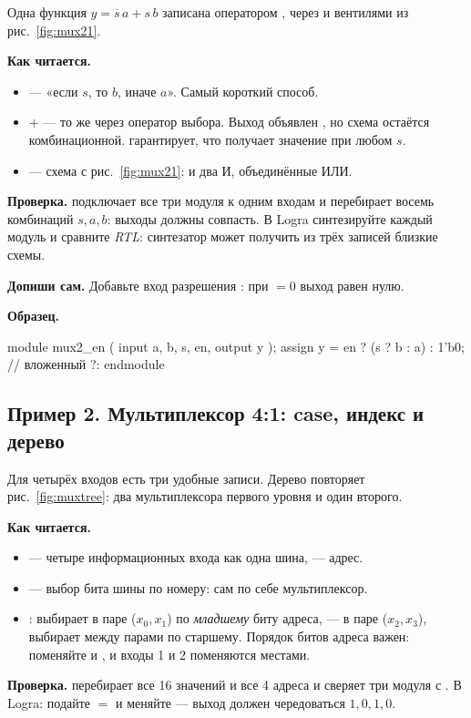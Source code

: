 Одна функция $y=\overline{s}\,a+s\,b$ записана оператором , через
 и вентилями из рис.~\ref{fig:mux21}.


\textbf{Как читается.}
\begin{itemize}
  \item {} --- «если $s$, то $b$, иначе $a$». Самый короткий способ.
  \item {} +  --- то же через оператор выбора. Выход объявлен , но схема остаётся комбинационной.  гарантирует, что  получает значение при любом $s$.
  \item {} --- схема с рис.~\ref{fig:mux21}:  и два И, объединённые ИЛИ.
\end{itemize}
\textbf{Проверка.}  подключает все три модуля к одним входам и
перебирает восемь комбинаций $s,a,b$: выходы должны совпасть. В Logra
синтезируйте каждый модуль и сравните \emph{RTL}: синтезатор может получить из
трёх записей близкие схемы.

\textbf{Допиши сам.} Добавьте вход разрешения : при  $=0$ выход
равен нулю.

\textbf{Образец.}
\begin{vcode}
module mux2_en (
    input  a, b, s, en,
    output y
);
    assign y = en ? (s ? b : a) : 1'b0;   // вложенный ?:
endmodule
\end{vcode}

\subsection{Пример 2. Мультиплексор 4:1: case, индекс и дерево}

Для четырёх входов есть три удобные записи. Дерево повторяет
рис.~\ref{fig:muxtree}: два мультиплексора первого уровня и один второго.


\textbf{Как читается.}
\begin{itemize}
  \item {} --- четыре информационных входа как одна шина,  --- адрес.
  \item {} --- выбор бита шины по номеру: сам по себе мультиплексор.
  \item {}:  выбирает в паре ($x_0,x_1$) по \emph{младшему} биту адреса,  --- в паре ($x_2,x_3$),  выбирает между парами по старшему. Порядок битов адреса важен: поменяйте  и , и входы 1 и 2 поменяются местами.
\end{itemize}
\textbf{Проверка.}  перебирает все 16 значений  и все
4 адреса и сверяет три модуля с . В Logra: подайте  $=$
 и меняйте  --- выход должен чередоваться $1,0,1,0$.


